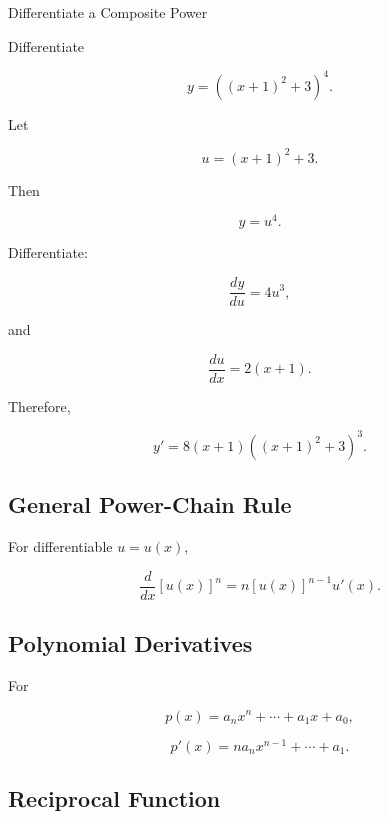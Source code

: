 \begin{workedexamplebox}{Differentiate a Composite Power}

Differentiate

\[
y
=
\left(
(x+1)^2+3
\right)^4.
\]

Let

\[
u
=
(x+1)^2+3.
\]

Then

\[
y=u^4.
\]

Differentiate:

\[
\frac{dy}{du}
=
4u^3,
\]

and

\[
\frac{du}{dx}
=
2(x+1).
\]

Therefore,

\begin{answerbox}
\[
\boxed{
y'
=
8(x+1)
\left(
(x+1)^2+3
\right)^3.
}
\]
\end{answerbox}

\end{workedexamplebox}

\subsection{General Power-Chain Rule}
\label{subsec:power-chain-rule}

For differentiable \(u=u(x)\),

\[
\boxed{
\frac{d}{dx}
[u(x)]^n
=
n[u(x)]^{n-1}u'(x).
}
\]

\subsection{Polynomial Derivatives}
\label{subsec:polynomial-derivatives-reference}

For

\[
p(x)
=
a_nx^n+\cdots+a_1x+a_0,
\]

\[
\boxed{
p'(x)
=
na_nx^{n-1}
+
\cdots
+
a_1.
}
\]

\subsection{Reciprocal Function}
\label{subsec:reciprocal-derivative-reference}

